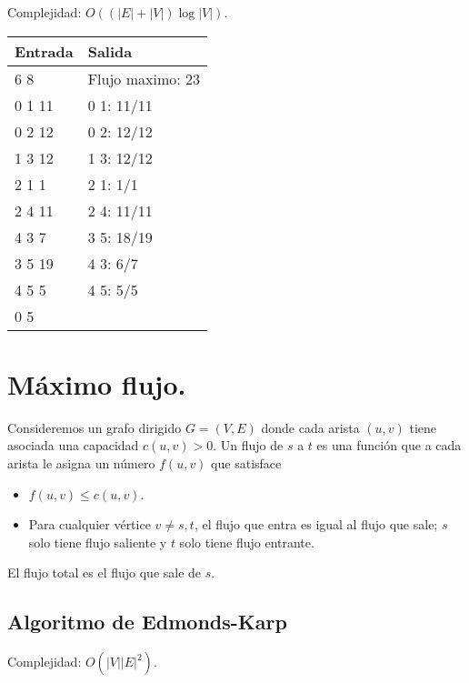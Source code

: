 \documentclass[12pt, letterpaper, twoside]{article}
\begin{document}
Complejidad: $O((|E| + |V|) \log|V|)$.

 \medskip

\begin{tabular}{|p{7cm}|p{7cm}|}
	\hline
	\textbf{Entrada} & \textbf{Salida}\\ \hline
	6 8 & Flujo maximo: 23\\
	0 1 11 & 0 1: 11/11\\
	0 2 12 & 0 2: 12/12\\
	1 3 12 & 1 3: 12/12\\
	2 1 1  & 2 1: 1/1\\
	2 4 11 & 2 4: 11/11\\
	4 3 7  & 3 5: 18/19\\
	3 5 19 & 4 3: 6/7\\
	4 5 5 & 4 5: 5/5\\ 
	0 5 & \\ \hline
\end{tabular}

\newpage

\section{Máximo flujo.}

Consideremos un grafo dirigido $G = (V, E)$ donde cada arista $(u, v)$ tiene asociada una capacidad $c(u,v) > 0$. Un flujo de $s$ a $t$ es una función que a cada arista le asigna un número $f(u,v)$ que satisface
\begin{itemize}
\item $f(u, v) \leq c(u,v)$.
\item Para cualquier vértice $v \neq s, t$, el flujo que entra es igual al flujo que sale; $s$ solo tiene flujo saliente y $t$ solo tiene flujo entrante.
\end{itemize}
El flujo total es el flujo que sale de $s$.


\subsection{Algoritmo de Edmonds-Karp}

Complejidad: $O(|V||E|^2)$.

 \medskip
\end{document}
